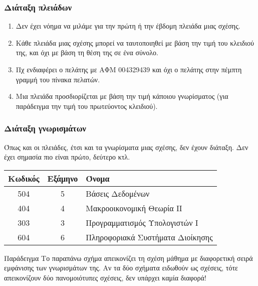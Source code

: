 \begin{frame}
\frametitle{Διάταξη πλειάδων}
\begin{minipage}{\wE}
  \pause
  \begin{enumerate}   \itemsep 4pt %
    \item Δεν έχει νόημα
          να μιλάμε για την πρώτη ή την έβδομη πλειάδα μιας σχέσης.
    \item Κάθε πλειάδα μιας σχέσης μπορεί να ταυτοποιηθεί με βάση την τιμή του κλειδιού της,
          και όχι με βάση τη θέση της σε ένα σύνολο.
    \item Πχ ενδιαφέρει ο πελάτης με ΑΦΜ 004329439 και όχι ο πελάτης στην πέμπτη
          γραμμή του πίνακα πελατών.
    \item Μια πλειάδα προσδιορίζεται με βάση την τιμή κάποιου γνωρίσματος (για παράδειγμα
          την τιμή του πρωτεύοντος κλειδιού).
  \end{enumerate} 
\end{minipage}
\end{frame}




\begin{frame}
\frametitle{Διάταξη γνωρισμάτων}
Όπως και οι πλειάδες, έτσι και τα γνωρίσματα μιας σχέσης, δεν έχουν διάταξη. 
Δεν έχει σημασία πιο είναι πρώτο, δεύτερο κτλ.
  \begin{tabular}{ c c l } \toprule
    {\bf Κωδικός} & {\bf Εξάμηνο} & {\bf Όνομα} \\ \midrule 
    504 & 5 & Βάσεις Δεδομένων  \\ 
    404 & 4 & Μακροοικονομική Θεωρία ΙΙ  \\  
    303 & 3 & Προγραμματισμός Υπολογιστών Ι  \\   
    604 & 6 & Πληροφοριακά Συστήματα Διοίκησης \\  \bottomrule
  \end{tabular}
  \par
  \begin{minipage}{\wE}
    \begin{exampleblock}{Παράδειγμα}
      Το παραπάνω σχήμα απεικονίζει τη σχέση {\ra\el μάθημα}
      με διαφορετική σειρά εμφάνισης των γνωρισμάτων της. Αν τα δύο σχήματα ειδωθούν ως σχέσεις,
      τότε απεικονίζουν δύο πανομοιότυπες σχέσεις, δεν υπάρχει καμία διαφορά!
    \end{exampleblock}
  \end{minipage}
\end{frame}



